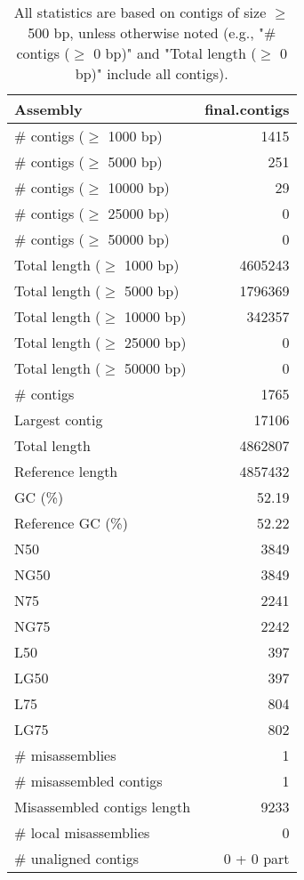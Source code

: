 \documentclass[12pt,a4paper]{article}
\begin{document}
\begin{table}[ht]
\begin{center}
\caption{All statistics are based on contigs of size $\geq$ 500 bp, unless otherwise noted (e.g., "\# contigs ($\geq$ 0 bp)" and "Total length ($\geq$ 0 bp)" include all contigs).}
\begin{tabular}{|l*{1}{|r}|}
\hline
Assembly & final.contigs \\ \hline
\# contigs ($\geq$ 1000 bp) & 1415 \\ \hline
\# contigs ($\geq$ 5000 bp) & 251 \\ \hline
\# contigs ($\geq$ 10000 bp) & 29 \\ \hline
\# contigs ($\geq$ 25000 bp) & 0 \\ \hline
\# contigs ($\geq$ 50000 bp) & 0 \\ \hline
Total length ($\geq$ 1000 bp) & 4605243 \\ \hline
Total length ($\geq$ 5000 bp) & 1796369 \\ \hline
Total length ($\geq$ 10000 bp) & 342357 \\ \hline
Total length ($\geq$ 25000 bp) & 0 \\ \hline
Total length ($\geq$ 50000 bp) & 0 \\ \hline
\# contigs & 1765 \\ \hline
Largest contig & 17106 \\ \hline
Total length & 4862807 \\ \hline
Reference length & 4857432 \\ \hline
GC (\%) & 52.19 \\ \hline
Reference GC (\%) & 52.22 \\ \hline
N50 & 3849 \\ \hline
NG50 & 3849 \\ \hline
N75 & 2241 \\ \hline
NG75 & 2242 \\ \hline
L50 & 397 \\ \hline
LG50 & 397 \\ \hline
L75 & 804 \\ \hline
LG75 & 802 \\ \hline
\# misassemblies & 1 \\ \hline
\# misassembled contigs & 1 \\ \hline
Misassembled contigs length & 9233 \\ \hline
\# local misassemblies & 0 \\ \hline
\# unaligned contigs & 0 + 0 part \\ \hline

\end{tabular}
\end{center}
\end{table}
\end{document}
